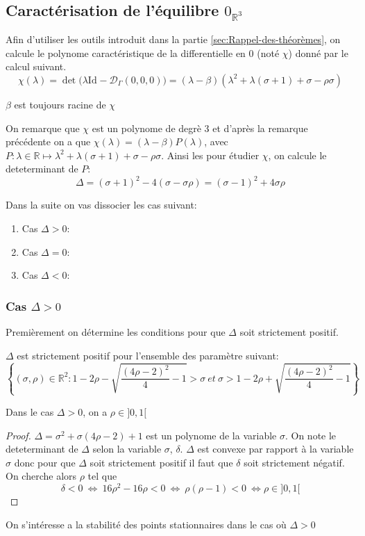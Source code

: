 \documentclass{article}
\newcommand{\R}{\mathbb{R}}
\newcommand{\id}[1][]{\ensuremath{\mathrm{Id}_{#1}}}
\newtheorem[M , nocut]{prop}{Proposition}[section]
\newtheorem[M]{propt}{Propriété}[section]
\newtheorem[L , nocut]{thm}{Théoreme}
\newtheorem[L]{cor}{Corollaire}
\begin{document}
\subsection{Caractérisation de l'équilibre $0_{\R^3}$}
Afin d'utiliser les outils introduit dans la partie \ref{sec:Rappel-des-théorèmes}, on calcule le polynome caractéristique de la differentielle en $0$ (noté $\chi$) donné par le calcul suivant.
\[
    \chi (\lambda) = \det\big(\lambda\id - \mathcal{D}_{\Gamma}(0,0,0)\big) = (\lambda - \beta)(\lambda^2 + \lambda(\sigma+1)+\sigma-\rho\sigma)
\]
\begin{example}[Remarque]
    $\beta$ est toujours racine de $\chi$
\end{example}
On remarque que $\chi$ est un polynome de degrè 3 et d'après la remarque précédente on a que $\chi(\lambda) = (\lambda - \beta)P(\lambda)$, avec $P:\lambda \in \R \mapsto \lambda^2 + \lambda(\sigma+1)+\sigma-\rho\sigma$. Ainsi les pour étudier $\chi$, on calcule le deteterminant de $P$:
\[
  \Delta = (\sigma+1)^2 - 4(\sigma-\sigma\rho) = (\sigma-1)^2 +4\sigma\rho
\]

Dans la suite on vas dissocier les cas suivant:
\begin{enumerate}
    \item Cas $\Delta > 0$:
    \item Cas $\Delta = 0$:
    \item Cas $\Delta < 0$:
\end{enumerate}

\subsubsection*{Cas $\Delta > 0$}
Premièrement on détermine les conditions pour que $\Delta$ soit strictement positif.
\begin{prop}
    $\Delta$ est strictement positif pour l'ensemble des paramètre suivant:
    \[
     \left\{(\sigma,\rho)\in \R ^2 : 1-2 \rho - \sqrt{\frac{(4\rho-2)^2}{4} -1 } > \sigma\ et \ \sigma > 1-2 \rho + \sqrt{ \frac{(4\rho-2)^2}{4} -1  } \right\}    
    \]
\end{prop}
\begin{example}
    Dans le cas $\Delta > 0$, on a $\rho \in ]0,1[$
\end{example}
\begin{proof}
    $\Delta = \sigma^2 + \sigma(4\rho-2) + 1$ est un polynome de la variable $\sigma$. On note le deteterminant de $\Delta$ selon la variable $\sigma$, $\delta$. $\Delta$ est convexe par rapport à la variable $\sigma$ donc pour que $\Delta$ soit strictement positif il faut que $\delta$ soit strictement négatif. On cherche alors $\rho$ tel que \[ \delta<0\ \Leftrightarrow\ 16\rho^2 - 16\rho <0\ \Leftrightarrow\ \rho(\rho-1)<0\ \Leftrightarrow \rho \in ]0,1[ \]
\end{proof}
On s'intéresse a la stabilité des points stationnaires dans le cas où $\Delta>0$
\end{document}
